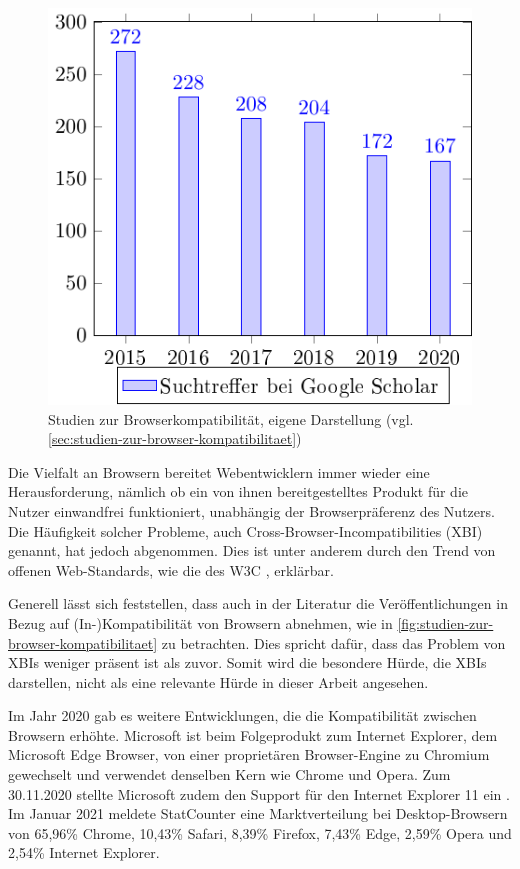 \begin{figure}
\centering
\includegraphics[width=\linewidth]{img/02_theorie/cross-browser_metastudie.png.pdf}
\caption{Studien zur Browserkompatibilität, eigene Darstellung (vgl. \ref{sec:studien-zur-browser-kompatibilitaet})}
\label{fig:studien-zur-browser-kompatibilitaet}
\end{figure}

Die Vielfalt an Browsern bereitet Webentwicklern immer wieder eine Herausforderung, nämlich ob ein von ihnen bereitgestelltes Produkt für die Nutzer einwandfrei funktioniert, unabhängig der Browserpräferenz des Nutzers. Die Häufigkeit solcher Probleme, auch Cross-Browser-Incompatibilities (XBI) \cite{XBIs} genannt, hat jedoch abgenommen. Dies ist unter anderem durch den Trend von offenen Web-Standards, wie die des W3C \cite{W3CStandards}, erklärbar.


Generell lässt sich feststellen, dass auch in der Literatur die Veröffentlichungen in Bezug auf (In-)Kompatibilität von Browsern abnehmen, wie in \autoref{fig:studien-zur-browser-kompatibilitaet} zu betrachten. Dies spricht dafür, dass das Problem von XBIs weniger präsent ist als zuvor. Somit wird die besondere Hürde, die XBIs darstellen, nicht als eine relevante Hürde in dieser Arbeit angesehen.

Im Jahr 2020 gab es weitere Entwicklungen, die die Kompatibilität zwischen Browsern erhöhte. Microsoft ist beim Folgeprodukt zum Internet Explorer, dem Microsoft Edge Browser, von einer proprietären Browser-Engine zu Chromium gewechselt \cite{MicrosoftEdgeChromium} und verwendet denselben Kern wie Chrome und Opera. Zum 30.11.2020 stellte Microsoft zudem den Support für den Internet Explorer 11 ein \cite{MicrosoftInternetExplorerDeprecation}. Im Januar 2021 meldete StatCounter \cite{StatCounterBrowserMarketshare} eine Marktverteilung bei Desktop-Browsern von 65,96\% Chrome, 10,43\% Safari, 8,39\% Firefox, 7,43\% Edge, 2,59\% Opera und 2,54\% Internet Explorer.
